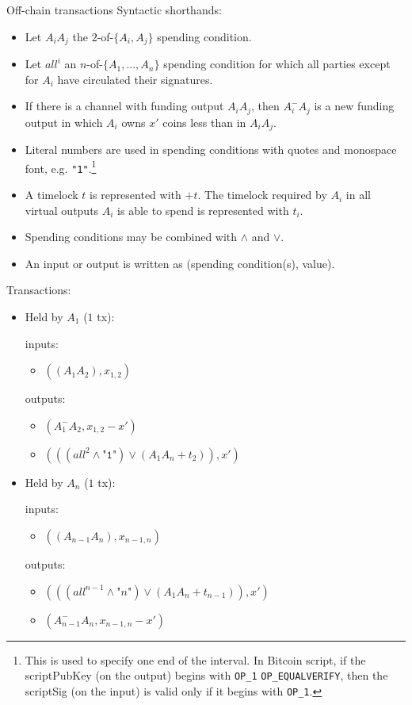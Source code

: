\begin{notitlebox}{Off-chain transactions}
  Syntactic shorthands:
  \begin{itemize}
    \item Let $A_i A_j$ the $2$-of-$\{A_i, A_j\}$ spending condition.
    \item Let $\mathit{all}^i$ an $n$-of-$\{A_1, \dots, A_n\}$ spending
    condition for which all parties except for $A_i$ have circulated their
    signatures.
    \item If there is a channel with funding output $A_i A_j$, then $A_i^{-}
    A_j$ is a new funding output in which $A_i$ owns $x'$ coins less than in
    $A_i A_j$.
    \item Literal numbers are used in spending conditions with quotes and
    monospace font, e.g. \texttt{"1"}.\footnote{This is used to specify one end
    of the interval. In Bitcoin script, if the scriptPubKey (on the output)
    begins with \texttt{OP\_1} \texttt{OP\_EQUALVERIFY}, then the scriptSig (on
    the input) is valid only if it begins with \texttt{OP\_1}.}
    \item A timelock $t$ is represented with $+t$. The timelock required by
    $A_i$ in all virtual outputs $A_i$ is able to spend is represented with
    $t_i$.
    \item Spending conditions may be combined with $\wedge$ and $\vee$.
    \item An input or output is written as (spending condition(s), value).
  \end{itemize}
  Transactions:
  \begin{itemize}
    \item Held by $A_1$ ($1$ tx):

    inputs:
    \begin{itemize}
      \item $((A_1 A_2), x_{1,2})$
    \end{itemize}
    outputs:
    \begin{itemize}
      \item $(A_1^- A_2, x_{1,2} - x')$
      \item $(((\mathit{all}^2 \wedge \texttt{"1"}) \vee (A_1 A_n + t_2)), x')$
    \end{itemize}

    \item Held by $A_n$ ($1$ tx):

    inputs:
    \begin{itemize}
      \item $((A_{n-1} A_n), x_{n-1,n})$
    \end{itemize}
    outputs:
    \begin{itemize}
      \item $(((\mathit{all}^{n-1} \wedge \texttt{"}n\texttt{"}) \vee (A_1 A_n +
      t_{n-1})), x')$
      \item $(A_{n-1}^- A_n, x_{n-1,n} - x')$
    \end{itemize}


\end{itemize}
\end{notitlebox}
